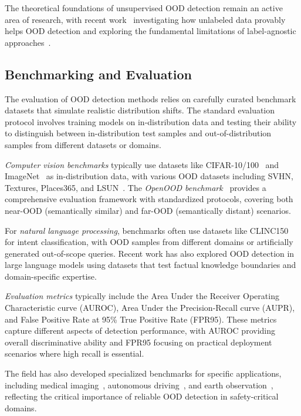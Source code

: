 \documentclass[11pt, oneside]{book}
\theoremstyle{plain}
\theoremstyle{definition}
\theoremstyle{remark}
\begin{document}
The theoretical foundations of unsupervised OOD detection remain an active area of research, with recent work~\citep{du2024does} investigating how unlabeled data provably helps OOD detection and exploring the fundamental limitations of label-agnostic approaches~\citep{yangcan}.

\subsection{Benchmarking and Evaluation}

The evaluation of OOD detection methods relies on carefully curated benchmark datasets that simulate realistic distribution shifts. The standard evaluation protocol involves training models on in-distribution data and testing their ability to distinguish between in-distribution test samples and out-of-distribution samples from different datasets or domains.

\emph{Computer vision benchmarks} typically use datasets like CIFAR-10/100~\citep{cifar10} and ImageNet~\citep{ILSVRC15} as in-distribution data, with various OOD datasets including SVHN, Textures, Places365, and LSUN~\citep{yang2022openood}. The \emph{OpenOOD benchmark}~\citep{yang2022openood,zhang2023openood} provides a comprehensive evaluation framework with standardized protocols, covering both near-OOD (semantically similar) and far-OOD (semantically distant) scenarios.

For \emph{natural language processing}, benchmarks often use datasets like CLINC150 for intent classification, with OOD samples from different domains or artificially generated out-of-scope queries. Recent work has also explored OOD detection in large language models using datasets that test factual knowledge boundaries and domain-specific expertise.

\emph{Evaluation metrics} typically include the Area Under the Receiver Operating Characteristic curve (AUROC), Area Under the Precision-Recall curve (AUPR), and False Positive Rate at 95\% True Positive Rate (FPR95). These metrics capture different aspects of detection performance, with AUROC providing overall discriminative ability and FPR95 focusing on practical deployment scenarios where high recall is essential.

The field has also developed specialized benchmarks for specific applications, including medical imaging~\citep{zhang2021out}, autonomous driving~\citep{ramanagopal2018failing}, and earth observation~\citep{ekim2024distribution}, reflecting the critical importance of reliable OOD detection in safety-critical domains.
\end{document}
